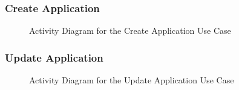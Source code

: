 \documentclass[11pt]{article}
\begin{document}
\subsubsection{Create Application}

\begin{figure}[H]
	\caption{Activity Diagram for the Create Application Use Case}
\end{figure}
\subsubsection{Update Application}
\begin{figure}[H]
	\caption{Activity Diagram for the Update Application Use Case}
\end{figure}
\end{document}
